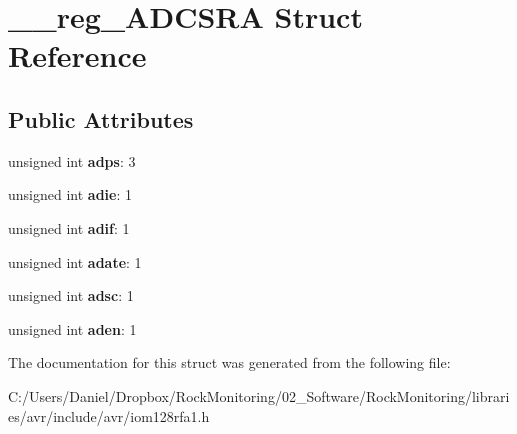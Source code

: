\hypertarget{struct____reg___a_d_c_s_r_a}{}\section{\+\_\+\+\_\+reg\+\_\+\+A\+D\+C\+S\+RA Struct Reference}
\label{struct____reg___a_d_c_s_r_a}
\subsection*{Public Attributes}
\begin{DoxyCompactItemize}
\item 
unsigned int {\bfseries adps}\+: 3\hypertarget{struct____reg___a_d_c_s_r_a_a5fd112e88bdf955be9eb38c1892b5c10}{}\label{struct____reg___a_d_c_s_r_a_a5fd112e88bdf955be9eb38c1892b5c10}

\item 
unsigned int {\bfseries adie}\+: 1\hypertarget{struct____reg___a_d_c_s_r_a_a3e3a513b7cb63fec043d129f9ec6e7d2}{}\label{struct____reg___a_d_c_s_r_a_a3e3a513b7cb63fec043d129f9ec6e7d2}

\item 
unsigned int {\bfseries adif}\+: 1\hypertarget{struct____reg___a_d_c_s_r_a_ab0a2c363cb8dcfd668dd537b90cf4f36}{}\label{struct____reg___a_d_c_s_r_a_ab0a2c363cb8dcfd668dd537b90cf4f36}

\item 
unsigned int {\bfseries adate}\+: 1\hypertarget{struct____reg___a_d_c_s_r_a_ab0b6d412384c5a065028380f605336c0}{}\label{struct____reg___a_d_c_s_r_a_ab0b6d412384c5a065028380f605336c0}

\item 
unsigned int {\bfseries adsc}\+: 1\hypertarget{struct____reg___a_d_c_s_r_a_a9bd8b836c5fd59099c41c149a8981d4a}{}\label{struct____reg___a_d_c_s_r_a_a9bd8b836c5fd59099c41c149a8981d4a}

\item 
unsigned int {\bfseries aden}\+: 1\hypertarget{struct____reg___a_d_c_s_r_a_aa815714799c217e81586633717b5ac10}{}\label{struct____reg___a_d_c_s_r_a_aa815714799c217e81586633717b5ac10}

\end{DoxyCompactItemize}


The documentation for this struct was generated from the following file\+:\begin{DoxyCompactItemize}
\item 
C\+:/\+Users/\+Daniel/\+Dropbox/\+Rock\+Monitoring/02\+\_\+\+Software/\+Rock\+Monitoring/libraries/avr/include/avr/iom128rfa1.\+h\end{DoxyCompactItemize}
